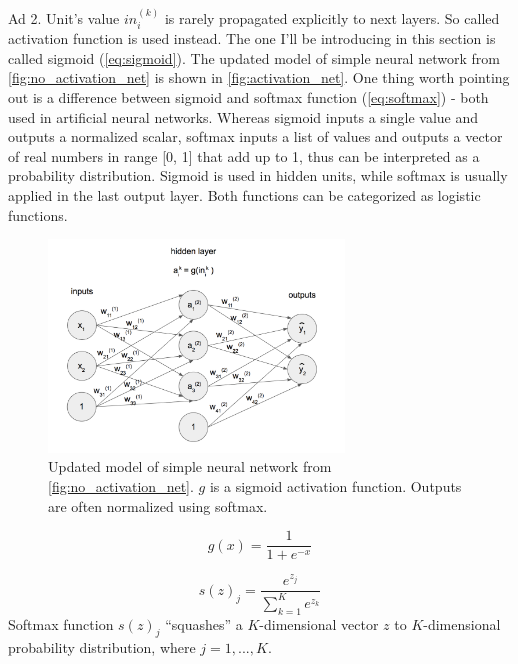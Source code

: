 \documentclass[11pt]{article}
\begin{document}
Ad 2. Unit's value $in_i^{(k)}$ is rarely propagated explicitly to next layers. So called activation function is used instead. The one I'll be introducing in this section is called sigmoid (\autoref{eq:sigmoid}). The updated model of simple neural network from \autoref{fig:no_activation_net} is shown in \autoref{fig:activation_net}. One thing worth pointing out is a difference between sigmoid and softmax function (\autoref{eq:softmax}) - both used in artificial neural networks. Whereas sigmoid inputs a single value and outputs a normalized scalar, softmax inputs a list of values and outputs a vector of real numbers in range [0, 1] that add up to 1, thus can be interpreted as a probability distribution. Sigmoid is used in hidden units, while softmax is usually applied in the last output layer. Both functions can be categorized as logistic functions.\\

\begin{figure}[h]
\includegraphics[width=0.7\textwidth]{activation_net}
\centering
\caption{Updated model of simple neural network from \autoref{fig:no_activation_net}. $g$ is a sigmoid activation function. Outputs are often normalized using softmax.}
\label{fig:activation_net}
\end{figure}

\begin{equation} \label{eq:sigmoid}
g(x) = \frac{1}{1 + e^{-x}}
\end{equation}

\begin{equation} \label{eq:softmax}
s(z)_j = \frac{e^{z_j}}{\sum_{k=1}^Ke^{z_k}}
\end{equation}
Softmax function $s(z)_j$ “squashes” a $K$-dimensional vector $z$ to $K$-dimensional probability distribution, where $j=1, ..., K$.\\
\end{document}
